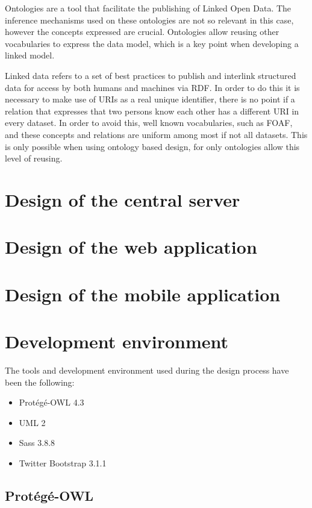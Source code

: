 Ontologies are a tool that facilitate the publishing of Linked Open Data. The inference mechanisms used on these ontologies are not so relevant in this case, however the concepts expressed are crucial. Ontologies allow reusing other vocabularies to express the data model, which is a key point when developing a linked model.

Linked data refers to a set of best practices to publish and interlink structured data for access by both humans and machines via RDF. In order to do this it is necessary to make use of URIs as a real unique identifier, there is no point if a relation that expresses that two persons know each other has a different URI in every dataset. In order to avoid this, well known vocabularies, such as FOAF, and these concepts and relations are uniform among most if not all datasets. This is only possible when using ontology based design, for only ontologies allow this level of reusing.

\section{Design of the central server}\label{sec:serverdesign}

\section{Design of the web application}\label{sec:webappdesign}

\section{Design of the mobile application}\label{sec:mobileappdesign}

\section{Development environment}

The tools and development environment used during the design process have been the following:

\begin{itemize}
\item Prot\'eg\'e-OWL 4.3
\item UML 2
\item Sass 3.8.8
\item Twitter Bootstrap 3.1.1
\end{itemize}

\subsection{Prot\'eg\'e-OWL}

